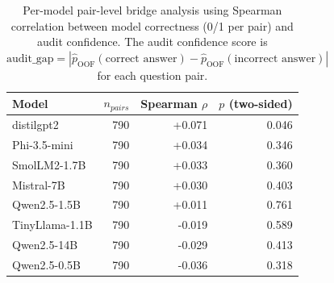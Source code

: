 \begin{table}[t]
\centering
\caption{Per-model pair-level bridge analysis using Spearman correlation between model correctness (0/1 per pair) and audit confidence. The audit confidence score is $\mathrm{audit\_gap}=|\hat p_{\mathrm{OOF}}(\text{correct answer})-\hat p_{\mathrm{OOF}}(\text{incorrect answer})|$ for each question pair.}
\label{tab:per_pair_bridge}
\begin{tabular}{lrrr}
\toprule
Model & $n_{pairs}$ & Spearman $\rho$ & $p$ (two-sided) \\
\midrule
distilgpt2 & 790 & +0.071 & 0.046 \\
Phi-3.5-mini & 790 & +0.034 & 0.346 \\
SmolLM2-1.7B & 790 & +0.033 & 0.360 \\
Mistral-7B & 790 & +0.030 & 0.403 \\
Qwen2.5-1.5B & 790 & +0.011 & 0.761 \\
TinyLlama-1.1B & 790 & -0.019 & 0.589 \\
Qwen2.5-14B & 790 & -0.029 & 0.413 \\
Qwen2.5-0.5B & 790 & -0.036 & 0.318 \\
\bottomrule
\end{tabular}
\end{table}

